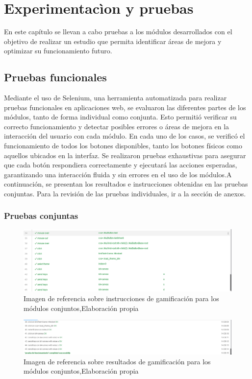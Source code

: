 \section{Experimentacìon y pruebas}
En este capítulo se llevan a cabo pruebas a los módulos desarrollados con el objetivo de realizar un estudio que permita identificar áreas de mejora y optimizar su funcionamiento futuro.
\subsection{Pruebas funcionales}
Mediante el uso de Selenium, una herramienta automatizada para realizar pruebas funcionales en aplicaciones web, se evaluaron las diferentes partes de los módulos, tanto de forma individual como conjunta. Esto permitió verificar su correcto funcionamiento y detectar posibles errores o áreas de mejora en la interacción del usuario con cada módulo.
En cada uno de los casos, se verificó el funcionamiento de todos los botones disponibles, tanto los botones físicos como aquellos ubicados en la interfaz. Se realizaron pruebas exhaustivas para asegurar que cada botón respondiera correctamente y ejecutará las acciones esperadas, garantizando una interacción fluida y sin errores en el uso de los módulos.A continuación, se presentan los resultados e instrucciones obtenidas en las pruebas conjuntas. Para la revisión de las pruebas individuales, ir a la sección de anexos.

\subsubsection{Pruebas conjuntas}

\begin{figure}[ht]
  \centering
  \includegraphics[width=1\linewidth]{Imagenes/Imagen11.png}
  \caption{Imagen de referencia sobre instrucciones de gamificación para los módulos conjuntos,Elaboración propia}
  \label{fig:imagen1pruebas}
\end{figure}
\begin{figure}[ht]
  \centering
  \includegraphics[width=1\linewidth]{Imagenes/Imagen12.png}
  \caption{Imagen de referencia sobre resultados de gamificación para los módulos conjuntos,Elaboración propia}
  \label{fig:imagen2pruebas}
\end{figure}

